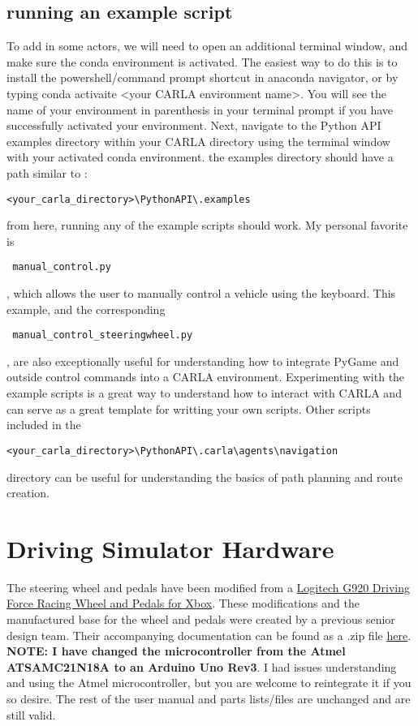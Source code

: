 \documentclass{article}
\begin{document}
\subsection{running an example script}
To add in some actors, we will need to open an additional terminal window, and make sure the conda environment is activated. The easiest way to do this is to install the powershell/command prompt shortcut in anaconda navigator, or by typing conda activaite <your CARLA environment name>. You will see the name of your environment in parenthesis in your terminal prompt if you have successfully activated your environment. Next, navigate to the Python API examples directory within your CARLA directory using the terminal window with your activated conda environment. the examples directory should have a path similar to :
\begin{verbatim}<your_carla_directory>\PythonAPI\.examples  \end{verbatim}

from here, running any of the example scripts should work. My personal favorite is \begin{verbatim} manual_control.py \end{verbatim}, which allows the user to manually control a vehicle using the keyboard. This example, and the corresponding \begin{verbatim} manual_control_steeringwheel.py \end{verbatim} , are also exceptionally useful for understanding how to integrate PyGame and outside control commands into a CARLA environment.
Experimenting with the example scripts is a great way to understand how to interact with CARLA and can serve as a great template for writting your own scripts. Other scripts included in the  \begin{verbatim}<your_carla_directory>\PythonAPI\.carla\agents\navigation  \end{verbatim} directory can be useful for understanding the basics of path planning and route creation.

\section{Driving Simulator Hardware}
The steering wheel and pedals have been modified from a \href{https://www.logitechg.com/en-sa/products/driving/driving-force-racing-wheel.941-000123.html}{Logitech G920 Driving Force Racing Wheel and Pedals for Xbox}.  These modifications and the manufactured base for the wheel and pedals were created by a previous senior design team. Their accompanying documentation can be found as a .zip file \href{https://alabama.box.com/s/ppm0j7ax0zvq7z98z6g3qv7kapbet37a}{here}. \textbf{NOTE: I have changed the microcontroller from the Atmel ATSAMC21N18A to an Arduino Uno Rev3}. I had issues understanding and using the Atmel microcontroller, but you are welcome to reintegrate it if you so desire. The rest of the user manual and parts lists/files are unchanged and are still valid. 
\end{document}

